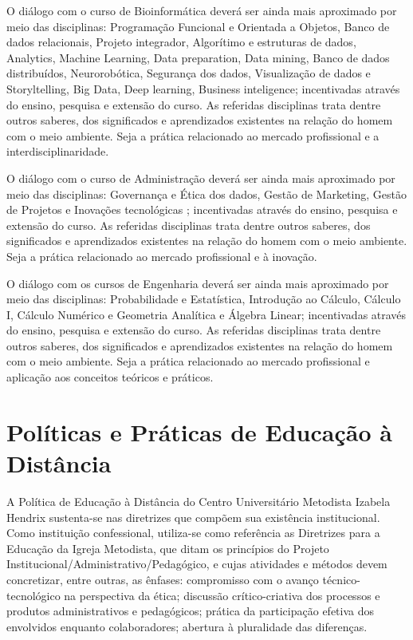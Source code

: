 \documentclass[a4paper, 12pt, openright, oneside, german, french, english, brazil]{abntex2}
\begin{document}
O diálogo com o curso de Bioinformática deverá ser ainda mais aproximado por meio das disciplinas: Programação Funcional e Orientada a Objetos, Banco de dados relacionais, Projeto integrador, Algorítimo e estruturas de dados, Analytics, Machine Learning, Data preparation, Data mining, Banco de dados distribuídos, Neurorobótica, Segurança dos dados, Visualização de dados e Storyltelling, Big Data, Deep learning, Business inteligence; incentivadas através do ensino, pesquisa e extensão do curso. As referidas disciplinas trata dentre outros saberes, dos significados e aprendizados existentes na relação do homem com o meio ambiente. Seja a prática relacionado ao mercado profissional e a interdisciplinaridade.

O diálogo com o curso de Administração deverá ser ainda mais aproximado por meio das disciplinas: Governança e Ética dos dados, Gestão de Marketing, Gestão de Projetos e Inovações tecnológicas ; incentivadas através do ensino, pesquisa e extensão do curso. As referidas disciplinas trata dentre outros saberes, dos significados e aprendizados existentes na relação do homem com o meio ambiente. Seja a prática relacionado ao mercado profissional e à inovação.

O diálogo com os cursos de Engenharia deverá ser ainda mais aproximado por meio das disciplinas: Probabilidade e Estatística, Introdução ao Cálculo, Cálculo I, Cálculo Numérico e Geometria Analítica e Álgebra Linear; incentivadas através do ensino, pesquisa e extensão do curso. As referidas disciplinas trata dentre outros saberes, dos significados e aprendizados existentes na relação do homem com o meio ambiente. Seja a prática relacionado ao mercado profissional e aplicação aos conceitos teóricos e práticos.


\section{Políticas e Práticas de Educação à Distância}

A Política de Educação à Distância do Centro Universitário Metodista Izabela Hendrix sustenta-se nas diretrizes que compõem sua existência institucional. Como instituição confessional, utiliza-se como referência as Diretrizes para a Educação da Igreja Metodista, que ditam os princípios do Projeto Institucional/Administrativo/Pedagógico, e cujas atividades e métodos devem concretizar, entre outras, as ênfases: compromisso com o avanço técnico-tecnológico na perspectiva da ética; discussão crítico-criativa dos processos e produtos administrativos e pedagógicos; prática da participação efetiva dos envolvidos enquanto colaboradores; abertura à pluralidade das diferenças.
\end{document}
